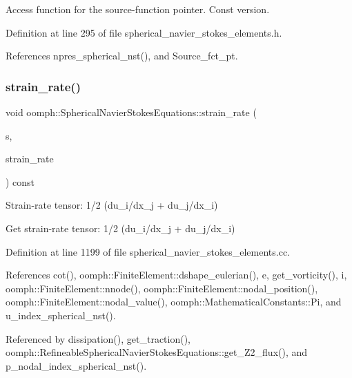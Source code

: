 Access function for the source-\/function pointer. Const version. 



Definition at line 295 of file spherical\+\_\+navier\+\_\+stokes\+\_\+elements.\+h.



References npres\+\_\+spherical\+\_\+nst(), and Source\+\_\+fct\+\_\+pt.

\mbox{\label{classoomph_1_1SphericalNavierStokesEquations_a4688b8021ff388a878ac9edbb218ef56}} 
\subsubsection{\texorpdfstring{strain\+\_\+rate()}{strain\_rate()}}
{\footnotesize\ttfamily void oomph\+::\+Spherical\+Navier\+Stokes\+Equations\+::strain\+\_\+rate (\begin{DoxyParamCaption}\item[{const \hyperlink{classoomph_1_1Vector}{Vector}$<$ double $>$ \&}]{s,  }\item[{\hyperlink{classoomph_1_1DenseMatrix}{Dense\+Matrix}$<$ double $>$ \&}]{strain\+\_\+rate }\end{DoxyParamCaption}) const}



Strain-\/rate tensor\+: 1/2 (du\+\_\+i/dx\+\_\+j + du\+\_\+j/dx\+\_\+i) 

Get strain-\/rate tensor\+: 1/2 (du\+\_\+i/dx\+\_\+j + du\+\_\+j/dx\+\_\+i) 

Definition at line 1199 of file spherical\+\_\+navier\+\_\+stokes\+\_\+elements.\+cc.



References cot(), oomph\+::\+Finite\+Element\+::dshape\+\_\+eulerian(), e, get\+\_\+vorticity(), i, oomph\+::\+Finite\+Element\+::nnode(), oomph\+::\+Finite\+Element\+::nodal\+\_\+position(), oomph\+::\+Finite\+Element\+::nodal\+\_\+value(), oomph\+::\+Mathematical\+Constants\+::\+Pi, and u\+\_\+index\+\_\+spherical\+\_\+nst().



Referenced by dissipation(), get\+\_\+traction(), oomph\+::\+Refineable\+Spherical\+Navier\+Stokes\+Equations\+::get\+\_\+\+Z2\+\_\+flux(), and p\+\_\+nodal\+\_\+index\+\_\+spherical\+\_\+nst().

